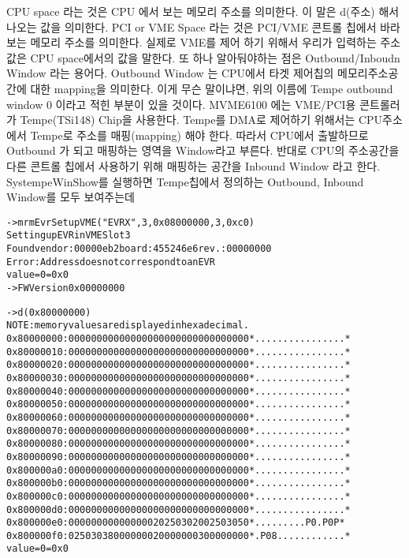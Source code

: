 \documentclass[11pt,a4paper]{article}
\begin{document}
CPU space 라는 것은 CPU 에서 보는 메모리 주소를 의미한다. 이 말은 d(주소) 해서 나오는 값을 의미한다.
PCI or VME Space 라는 것은 PCI/VME 콘트롤 칩에서 바라보는 메모리 주소를 의미한다.
실제로 VME를 제어 하기 위해서 우리가 입력하는 주소 값은 CPU space에서의 값을 말한다.
또 하나 알아둬야하는 점은 Outbound/Inboudn Window 라는 용어다.
Outbound Window 는 CPU에서 타겟 제어칩의 메모리주소공간에 대한 mapping을 의미한다.
이게 무슨 말이냐면, 위의 이름에 Tempe outbound window 0 이라고 적힌 부분이 있을 것이다. 
MVME6100 에는 VME/PCI용 콘트롤러가 Tempe(TSi148) Chip을 사용한다. Tempe를 DMA로 제어하기 위해서는
CPU주소에서 Tempe로 주소를 매핑(mapping) 해야 한다. 따라서 CPU에서 출발하므로 Outbound 가 되고 
매핑하는 영역을 Window라고 부른다.
반대로 CPU의 주소공간을 다른 콘트롤 칩에서 사용하기 위해 매핑하는 공간을 Inbound Window 라고 한다.
SystempeWinShow를 실행하면 Tempe칩에서 정의하는 Outbound, Inbound Window를 모두 보여주는데



\begin{framed}
\begin{alltt}
-> mrmEvrSetupVME("EVRX",3,0x08000000,3,0xc0)
Setting up EVR in VME Slot 3
Found vendor: 00000eb2 board: 455246e6 rev.: 00000000
Error: Address does not correspond to an EVR
value = 0 = 0x0
-> FWVersion 0x00000000
\end{alltt}
\end{framed}





\begin{framed}
\begin{alltt}
-> d(0x80000000)
NOTE: memory values are displayed in hexadecimal.
0x80000000:  0000 0000 0000 0000 0000 0000 0000 0000  *................*
0x80000010:  0000 0000 0000 0000 0000 0000 0000 0000  *................*
0x80000020:  0000 0000 0000 0000 0000 0000 0000 0000  *................*
0x80000030:  0000 0000 0000 0000 0000 0000 0000 0000  *................*
0x80000040:  0000 0000 0000 0000 0000 0000 0000 0000  *................*
0x80000050:  0000 0000 0000 0000 0000 0000 0000 0000  *................*
0x80000060:  0000 0000 0000 0000 0000 0000 0000 0000  *................*
0x80000070:  0000 0000 0000 0000 0000 0000 0000 0000  *................*
0x80000080:  0000 0000 0000 0000 0000 0000 0000 0000  *................*
0x80000090:  0000 0000 0000 0000 0000 0000 0000 0000  *................*
0x800000a0:  0000 0000 0000 0000 0000 0000 0000 0000  *................*
0x800000b0:  0000 0000 0000 0000 0000 0000 0000 0000  *................*
0x800000c0:  0000 0000 0000 0000 0000 0000 0000 0000  *................*
0x800000d0:  0000 0000 0000 0000 0000 0000 0000 0000  *................*
0x800000e0:  0000 0000 0000 0002 0250 3020 0250 3050  *.........P0 .P0P*
0x800000f0:  0250 3038 0000 0002 0000 0003 0000 0000  *.P08............*
value = 0 = 0x0
\end{alltt}
\end{framed}
\end{document}
